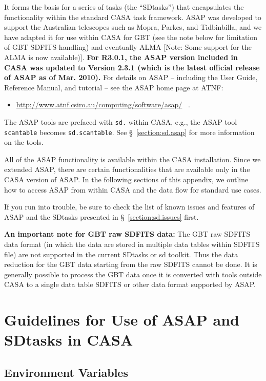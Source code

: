 It forms the basis for a series
of tasks (the ``SDtasks'') that encapsulates the functionality
within the standard CASA task framework.  ASAP was developed to
support the Australian telescopes such as Mopra, Parkes, and
Tidbinbilla, and we have adapted it for use within CASA for
GBT (see the note below for limitation of GBT SDFITS handling) 
and eventually ALMA [Note: Some support for the ALMA is now available)].  
{\bf For R3.0.1, the ASAP version included in CASA was updated to Version 2.3.1 (which is 
the latest official release of ASAP as of Mar. 2010).} 
For details on ASAP -- including the User Guide, Reference Manual, and tutorial -- see
the ASAP home page at ATNF: 
\begin{itemize}
   \item \url{http://www.atnf.csiro.au/computing/software/asap/} \, .
\end{itemize}
The ASAP tools are prefaced with {\tt sd.} within CASA, e.g., the ASAP tool {\tt scantable} becomes
{\tt sd.scantable}.  See \S~\ref{section:sd.asap} for more
information on the tools.

All of the ASAP functionality is available within the CASA
installation.  Since we extended ASAP, there
are certain functionalities that are available only in the CASA version of ASAP.
In the following sections of this appendix, we outline how to access ASAP
from within CASA and the data flow for standard use cases.

If you run into trouble, be sure to check the list of known issues
and features of ASAP and the SDtasks presented in 
\S~\ref{section:sd.issues} first.

{\bf An important note for GBT raw SDFITS data:} The GBT raw SDFITS data format
(in which the data are stored in multiple data tables within SDFITS file) are not
supported in the current SDtasks or sd toolkit. Thus the data reduction for the GBT
data starting from the raw SDFITS cannot be done. It is generally possible to 
process the GBT data once it is converted with tools outside CASA 
to a single data table SDFITS or other data format supported by ASAP.  


\section{Guidelines for Use of ASAP and SDtasks in CASA}
\label{section:sd.intro}

\subsection{Environment Variables}
\label{section:sd.intro.env}

